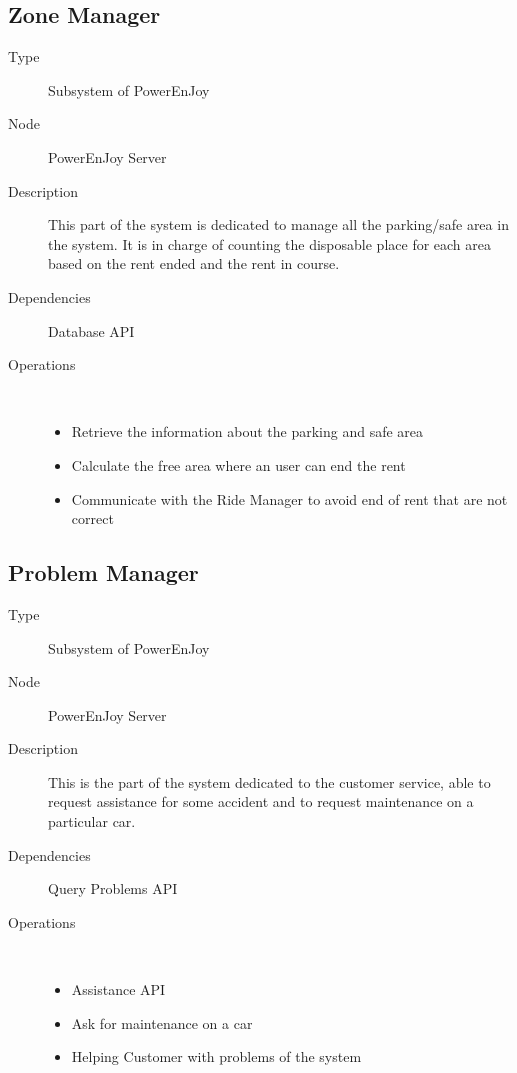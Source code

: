\subsection{Zone Manager}
\begin{description}
	\item[Type] Subsystem of PowerEnJoy
	\item[Node] PowerEnJoy Server
	\item[Description] This part of the system is dedicated to manage all the parking/safe area in the system. It is in charge of counting the disposable place for each area based on the rent ended and the rent in course.
	\item[Dependencies] Database API
	\item[Operations] \ \\
		\begin{itemize}
			\item Retrieve the information about the parking and safe area
			\item Calculate the free area where an user can end the rent
			\item Communicate with the Ride Manager to avoid end of rent that are not correct
	\end{itemize}
\end{description}

\subsection{Problem Manager}
\begin{description}
	\item[Type] Subsystem of PowerEnJoy
	\item[Node] PowerEnJoy Server
	\item[Description] This is the part of the system dedicated to the customer service, able to request assistance for some accident and to request maintenance on a particular car.
	\item[Dependencies] Query Problems API
	\item[Operations] \ \\
		\begin{itemize}
			\item Assistance API
			\item Ask for maintenance on a car
			\item Helping Customer with problems of the system
	\end{itemize}
\end{description}

